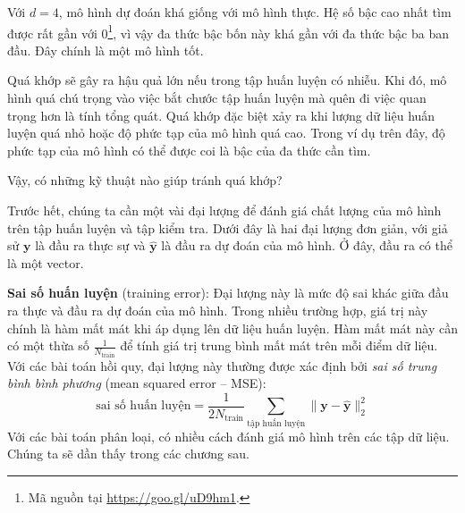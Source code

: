  
Với $d = 4$, mô hình dự đoán khá giống với mô hình thực. Hệ số bậc cao nhất tìm
được rất gần với 0\footnote{Mã nguồn tại \url{https://goo.gl/uD9hm1}.}, vì
vậy đa thức bậc bốn này khá gần với đa thức bậc ba ban đầu. Đây chính là một mô
hình tốt.

 
Quá khớp sẽ gây ra hậu quả lớn nếu trong tập huấn luyện có nhiễu. Khi
đó, mô hình quá chú trọng vào việc bắt chước tập huấn luyện mà quên đi việc
quan trọng hơn là tính tổng quát. Quá khớp đặc biệt xảy ra khi lượng dữ liệu huấn
luyện quá nhỏ hoặc độ phức tạp của mô hình quá cao. Trong ví dụ trên đây, độ
phức tạp của mô hình có thể được coi là bậc của đa thức cần tìm.

 
Vậy, có những kỹ thuật nào giúp tránh quá khớp? 
 
Trước hết, chúng ta cần một vài đại lượng để đánh giá chất lượng của mô hình
trên tập huấn luyện và tập kiểm tra. Dưới đây là hai đại lượng đơn giản, với
giả sử $\mathbf{y}$ là đầu ra thực sự và $\mathbf{\hat{y}}$ là đầu ra dự đoán
của mô hình. Ở đây, đầu ra có thể là một vector.
 
\textbf{Sai số huấn luyện} (training error): Đại lượng này là mức độ sai khác giữa đầu ra thực và đầu
ra dự đoán của mô hình. Trong nhiều trường hợp, giá trị này chính là hàm mất mát khi áp dụng lên dữ liệu huấn luyện. Hàm mất mát này cần có một thừa số $\displaystyle
\frac{1}{N_{\text{train}}}$ để tính giá trị trung bình mất mát
trên mỗi điểm dữ liệu. Với các bài toán hồi quy, đại lượng này thường được xác định bởi \textit{sai số trung bình bình phương} ({mean squared error -- MSE}):
\begin{equation*} 
\text{sai số huấn luyện}= \frac{1}{2N_{\text{train}}} \sum_{\text{tập huấn luyện}}
\|\mathbf{y} - \mathbf{\hat{y}}\|_2^2 
\end{equation*} 
Với các bài toán phân loại, có nhiều cách đánh giá mô hình trên các tập dữ liệu. Chúng ta sẽ dần thấy trong các chương sau.  

